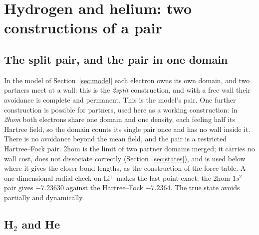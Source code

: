 \documentclass[11pt]{article}
\begin{document}
\section{Hydrogen and helium: two constructions of a pair}
\label{sec:h2}

\subsection{The split pair, and the pair in one domain}

In the model of Section~\ref{sec:model} each electron owns its own domain, and two partners meet at
a wall: this is the \emph{2split} construction, and with a free wall their avoidance is complete and
permanent. This is the model's pair. One further construction is possible for partners, used here as a
working construction: in
\emph{2hom} both electrons share one domain and one density, each feeling half its Hartree field, so the
domain counts its single pair once and has no wall inside it. There is no avoidance beyond the mean field,
and the pair is a restricted Hartree--Fock pair. 2hom is the limit of two partner domains merged; it
carries no wall cost, does not dissociate correctly (Section~\ref{sec:states}), and is used below where it
gives the closer bond lengths, as the construction of the force table. A one-dimensional radial check on Li$^+$ makes the last
point exact: the 2hom $1s^2$ pair gives $-7.23630$ against the Hartree--Fock $-7.2364$. The true
state avoids partially and dynamically.

\subsection{H$_2$ and He}
\end{document}
